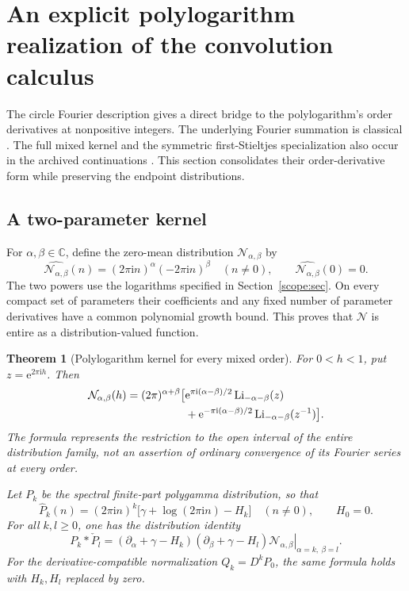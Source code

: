 \documentclass[11pt,letterpaper]{article}
\numberwithin{equation}{section}
\theoremstyle{plain}
\newtheorem{theorem}{Theorem}[section]
\theoremstyle{definition}
\theoremstyle{remark}
\newcommand{\bbC}{\mathbb C}
\newcommand{\numi}{\mathrm i}
\newcommand{\rme}{\mathrm e}
\newcommand{\rLi}{\operatorname{Li}}
\begin{document}


\section{An explicit polylogarithm realization of the convolution calculus}
\label{poly:sec}

The circle Fourier description gives a direct bridge to the
polylogarithm's order derivatives at nonpositive integers. The underlying
Fourier summation is classical \cite{DLMFPolylog,DLMFHurwitz}.
The full mixed kernel and the symmetric first-Stieltjes specialization
also occur in the archived continuations
\cite{RepoConvolutionAlgebra,RepoConvolutionCalculus}.
This section consolidates their order-derivative form while preserving
the endpoint distributions.

\subsection{A two-parameter kernel}

For \(\alpha,\beta\in\bbC\), define the zero-mean distribution
\(\mathcal N_{\alpha,\beta}\) by
\begin{equation}\label{poly:N-fourier}
 \widehat{\mathcal N_{\alpha,\beta}}(n)=
 (2\pi\numi n)^\alpha(-2\pi\numi n)^\beta\quad(n\ne0),
 \qquad \widehat{\mathcal N_{\alpha,\beta}}(0)=0.
\end{equation}
The two powers use the logarithms specified in Section~\ref{scope:sec}.
On every compact set of parameters their coefficients and any fixed
number of parameter derivatives have a common polynomial growth
bound. This proves that \(\mathcal N\) is entire as a
distribution-valued function.

\begin{theorem}[Polylogarithm kernel for every mixed order]
\label{poly:master}
For \(0<h<1\), put \(z=\rme^{2\pi\numi h}\). Then
\begin{align}\label{poly:N}
 \mathcal N_{\alpha,\beta}(h)
 =(2\pi)^{\alpha+\beta}\bigl[
 &\rme^{\pi\numi(\alpha-\beta)/2}
                 \rLi_{-\alpha-\beta}(z)\notag\\
 &+\rme^{-\pi\numi(\alpha-\beta)/2}
                 \rLi_{-\alpha-\beta}(z^{-1})\bigr].
\end{align}
The formula represents the restriction to the open interval of the
entire distribution family, not an assertion of ordinary convergence
of its Fourier series at every order.

Let \(P_k\) be the spectral finite-part polygamma distribution, so that
\[
 \widehat P_k(n)=(2\pi\numi n)^k
  \bigl[\gamma+\log(2\pi\numi n)-H_k\bigr]\quad(n\ne0),
 \qquad H_0=0.
\]
For all \(k,l\geq0\), one has the distribution identity
\begin{equation}\label{poly:mixed}
 P_k*\check P_l=
 \left.
 (\partial_\alpha+\gamma-H_k)
 (\partial_\beta+\gamma-H_l)
       \mathcal N_{\alpha,\beta}
 \right|_{\alpha=k,\ \beta=l}.
\end{equation}
For the derivative-compatible normalization \(Q_k=D^kP_0\), the same
formula holds with \(H_k,H_l\) replaced by zero.
\end{theorem}
\end{document}
